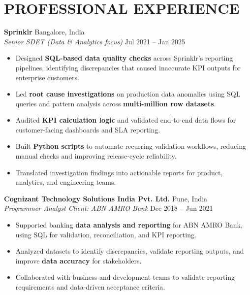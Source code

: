 \documentclass[letterpaper,10pt]{article}
\begin{document}
\section{PROFESSIONAL EXPERIENCE}
\small
\noindent\textbf{Sprinklr} \hfill \color{subtext}Bangalore, India\color{bodytext} \\
\textit{Senior SDET (Data \& Analytics focus)} \hfill \color{subtext}Jul 2021 -- Jan 2025\color{bodytext}
\begin{itemize}[leftmargin=1.2em, itemsep=1.5pt, parsep=0pt, topsep=2pt]
    \item Designed \textbf{SQL-based data quality checks} across Sprinklr's reporting pipelines, identifying discrepancies that caused inaccurate KPI outputs for enterprise customers.
    \item Led \textbf{root cause investigations} on production data anomalies using SQL queries and pattern analysis across \textbf{multi-million row datasets}.
    \item Audited \textbf{KPI calculation logic} and validated end-to-end data flows for customer-facing dashboards and SLA reporting.
    \item Built \textbf{Python scripts} to automate recurring validation workflows, reducing manual checks and improving release-cycle reliability.
    \item Translated investigation findings into actionable reports for product, analytics, and engineering teams.
\end{itemize}

\vspace{3pt}
\noindent\textbf{Cognizant Technology Solutions India Pvt. Ltd.} \hfill \color{subtext}Pune, India\color{bodytext} \\
\textit{Programmer Analyst \textbar{} Client: ABN AMRO Bank} \hfill \color{subtext}Dec 2018 -- Jun 2021\color{bodytext}
\begin{itemize}[leftmargin=1.2em, itemsep=1.5pt, parsep=0pt, topsep=2pt]
    \item Supported banking \textbf{data analysis and reporting} for ABN AMRO Bank, using SQL for validation, reconciliation, and KPI reporting.
    \item Analyzed datasets to identify discrepancies, validate reporting outputs, and improve \textbf{data accuracy} for stakeholders.
    \item Collaborated with business and development teams to validate reporting requirements and data-driven acceptance criteria.
\end{itemize}
\end{document}

